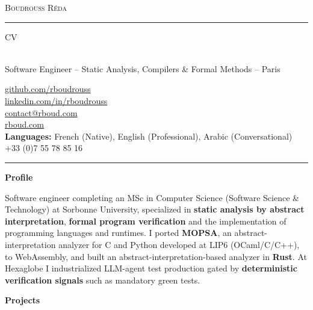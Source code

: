 \documentclass[10pt,A4]{article}
\newcommand{\cvsection}[1]
{
	\begin{center}
		\large\textcolor{sectcol}{\textbf{#1}}
	\end{center}
}
\newcommand{\metasection}[2]
{
\footnotesize{#2} \hspace*{\fill} \footnotesize{#1}\\[1pt]
}
\begin{document}
\pagestyle{fancy}


\vspace{-8pt}
\begin{center}
    {\HUGE \textsc{Boudrouss Réda} \textcolor{sectcol}{\rule[-1mm]{1mm}{0.9cm}} \textsc{CV}}\\[2pt]
    {\small Software Engineer -- Static Analysis, Compilers \& Formal Methods -- Paris}
\end{center}

\vspace{6pt}

\metasection{\href{https://github.com/rboudrouss}{github.com/rboudrouss}}{}
\metasection{\href{https://www.linkedin.com/in/rboudrouss}{linkedin.com/in/rboudrouss}}{}
\metasection{\href{mailto:contact@rboud.com}{contact@rboud.com}}{}
\metasection{\href{https://rboud.com}{rboud.com}}{}
\metasection{+33 (0)7 55 78 85 16}{\textbf{Languages:} French (Native), English (Professional), Arabic (Conversational)}

\vspace{-15pt}
\textcolor{softcol}{\hrule}

\normalsize

\cvsection{Profile}
Software engineer completing an MSc in Computer Science (Software Science \& Technology) at Sorbonne University, specialized in \textbf{static analysis by abstract interpretation}, \textbf{formal program verification} and the implementation of programming languages and runtimes. I ported \textbf{MOPSA}, an abstract-interpretation analyzer for C and Python developed at LIP6 (OCaml/C/C++), to WebAssembly, and built an abstract-interpretation-based analyzer in \textbf{Rust}. At Hexaglobe I industrialized LLM-agent test production gated by \textbf{deterministic verification signals} such as mandatory green tests.

\cvsection{Projects}
\end{document}
